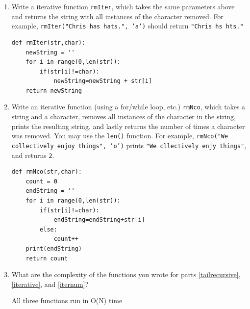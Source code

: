 \documentclass[11pt]{article}
\newenvironment{answer}{\large\lstset{basicstyle=\large}\color{white}}{}
\newenvironment{answer}{\large\lstset{basicstyle=\large}\color{red}}{}
\begin{document}
\begin{enumerate}
\begin{enumerate}
\item
\label{iterative}
Write a iterative function \texttt{rmIter}, which takes the same parameters above and returns the string with all instances of the character removed.
For example, \texttt{rmIter("Chris has hats.", 'a')} should return \texttt{"Chris hs hts."}
\begin{answer}
\begin{lstlisting}
def rmIter(str,char):
    newString = ''
    for i in range(0,len(str)):
        if(str[i]!=char):
            newString=newString + str[i]
    return newString
\end{lstlisting}
\end{answer}

\newpage
\item
\label{iternum}
Write an iterative function (using a for/while loop, etc.) \texttt{rmNco}, which takes a string and a character, removes all instances of the character in the string, prints the resulting string, and lastly returns the number of times a character was removed.
You may use the \texttt{len()} function.
For example, \texttt{rmNco("We collectively enjoy things", 'o')} prints \texttt{"We cllectively enjy things"}, and returns \texttt{2}.
\begin{answer}
\begin{lstlisting}
def rmNco(str,char):
    count = 0
    endString = ''
    for i in range(0,len(str)):
        if(str[i]!=char):
            endString=endString+str[i]
        else:
            count++
    print(endString)
    return count
\end{lstlisting}
\end{answer}

\item
What are the complexity of the functions you wrote for parts \ref{tailrecursive}, \ref{iterative}, and \ref{iternum}?
\begin{answer}

All three functions run in O(N) time
\end{answer}
\end{enumerate}


\end{enumerate}
\end{document}
